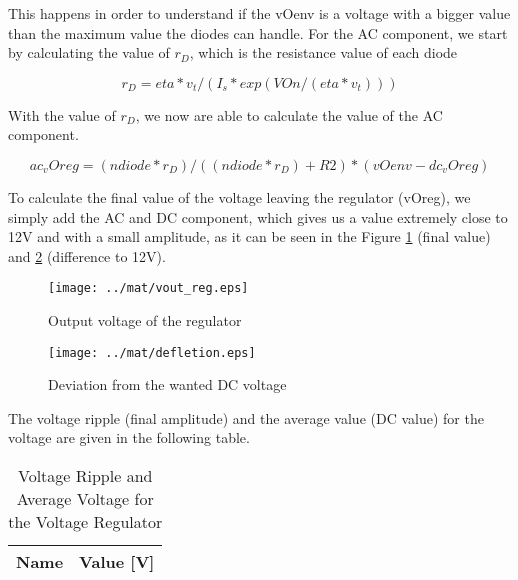 This happens in order to understand if the vOenv is a voltage with a bigger value than the maximum value the diodes can handle.
For the AC component, we start by calculating the value of $r_D$, which is the resistance value of each diode

\begin{equation}
r_D = eta*v_t/(I_s*exp(VOn/(eta*v_t)))
\label{eq:1.6}
\end{equation}

With the value of $r_D$, we now are able to calculate the value of the AC component.

\begin{equation}
ac_vOreg = (ndiode*r_D)/((ndiode*r_D)+R2)*(vOenv-dc_vOreg)
\label{eq:1.7}
\end{equation}

To calculate the final value of the voltage leaving the regulator (vOreg), we simply add the AC and DC component, which gives us a value extremely close to 12V and with a small amplitude, as it can be seen in the Figure \ref{fig:mat5} (final value) and \ref{fig:mat6} (difference to 12V).

\begin{figure}[H] \centering
\texttt{[image: ../mat/vout\_reg.eps]}
\caption{Output voltage of the regulator}
\label{fig:mat5}
\end{figure}

\begin{figure}[H] \centering
\texttt{[image: ../mat/defletion.eps]}
\caption{Deviation from the wanted DC voltage} 
\label{fig:mat6}
\end{figure}

The voltage ripple (final amplitude) and the average value (DC value) for the voltage are given in the following table.

\begin{table}[H]
  \centering
  \begin{tabular}{|l|r|}
    \hline    
    {\bf Name} & {\bf Value [V]} \\ \hline
    
  \end{tabular}
  \caption{Voltage Ripple and Average Voltage for the Voltage Regulator}
  \label{tab:mat7}
\end{table}



